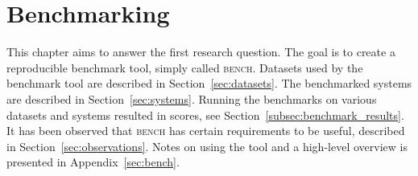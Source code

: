 \chapter{Benchmarking}
\label{ch:benchmarking}

This chapter aims to answer the first research question.
The goal is to create a reproducible benchmark tool, simply called \textsc{bench}.
Datasets used by the benchmark tool are described in Section~\ref{sec:datasets}.
The benchmarked systems are described in Section~\ref{sec:systems}.
Running the benchmarks on various datasets and systems resulted in scores, see Section~\ref{subsec:benchmark_results}.
It has been observed that \textsc{bench} has certain requirements to be useful, described in Section~\ref{sec:observations}.
Notes on using the tool and a high-level overview is presented in Appendix~\ref{sec:bench}.








